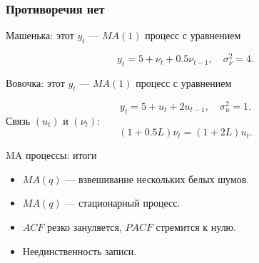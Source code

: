 \begin{frame}
  \frametitle{Противоречия нет}

  Машенька: этот $y_t$ — $MA(1)$ процесс с уравнением

  \[
    y_t = 5 + \nu_t + 0.5 \nu_{t-1}, \quad \sigma^2_{\nu} = 4.
  \]

  Вовочка: этот $y_t$ — $MA(1)$ процесс с уравнением

  \[
    y_t = 5 + u_t + 2 u_{t-1}, \quad \sigma^2_u = 1.
  \]
  \pause
  Связь $(u_t)$ и $(\nu_t)$:
  \[
  (1+0.5L)\nu_t = (1+2L)u_t.  
  \]
\end{frame}



\begin{frame}{MA процессы: итоги}

  \begin{itemize}[<+->]
    \item $MA(q)$ — взвешивание нескольких белых шумов. 
    \item $MA(q)$ — стационарный процесс. 
    \item $ACF$ резко зануляется, $PACF$ стремится к нулю.
    \item Неединственность записи. 
  \end{itemize}
\end{frame}



